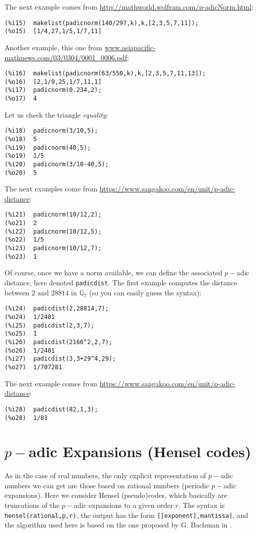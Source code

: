\documentclass[fleqn]{cas-sc}
\begin{document}
The next example comes from \url{http://mathworld.wolfram.com/p-adicNorm.html}:
\begin{verbatim}
(%i15)	makelist(padicnorm(140/297,k),k,[2,3,5,7,11]);
(%o15)	[1/4,27,1/5,1/7,11]
\end{verbatim}

Another example, this one from \url{www.asiapacific-mathnews.com/03/0304/0001_0006.pdf}:
\begin{verbatim}
(%i16)	makelist(padicnorm(63/550,k),k,[2,3,5,7,11,13]);
(%o16)	[2,1/9,25,1/7,11,1]
(%i17)	padicnorm(0.234,2);
(%o17)	4
\end{verbatim}

Let us check the triangle \emph{equality}:
\begin{verbatim}
(%i18)	padicnorm(3/10,5);
(%o18)	5
(%i19)	padicnorm(40,5);
(%o19)	1/5
(%i20)	padicnorm(3/10-40,5);
(%o20)	5
\end{verbatim}

The next examples come from \url{https://www.sangakoo.com/en/unit/p-adic-distance}:
\begin{verbatim}
(%i21)	padicnorm(10/12,2);
(%o21)	2
(%i22)	padicnorm(10/12,5);
(%o22)	1/5
(%i23)	padicnorm(10/12,7);
(%o23)	1
\end{verbatim}

Of course, once we have a norm available, we can define the
associated $p-$adic distance, here denoted \texttt{padicdist}.
The first example computes the distance between $2$ and $28814$ in
$\mathbb{Q}_7$ (so you can easily guess the syntax):
	
\begin{verbatim}
(%i24)	padicdist(2,28814,7);
(%o24)	1/2401
(%i25)	padicdist(2,3,7);
(%o25)	1
(%i26)	padicdist(2166^2,2,7);
(%o26)	1/2401
(%i27)	padicdist(3,3+29^4,29);
(%o27)	1/707281
\end{verbatim}
The next example comes from \url{https://www.sangakoo.com/en/unit/p-adic-distance}:

\begin{verbatim}
(%i28)	padicdist(82,1,3);
(%o28)	1/81
\end{verbatim}

\section{$p-$adic Expansions (Hensel codes)}\label{sec3}

\noindent As in the case of real numbers, the only explicit representation of 
$p-$adic numbers we can get are those based on rational numbers (periodic $p-$adic
expansions). Here we consider Hensel (pseudo)codes, which basically are truncations
of the $p-$adic expansions to a given order $r$.
The syntax is \texttt{hensel(rational,p,r)}, the output has the form \texttt{[[exponent],mantissa]}, and the algorithm used
here is based on the one proposed by G. Bachman in \cite{1}.
\end{document}
